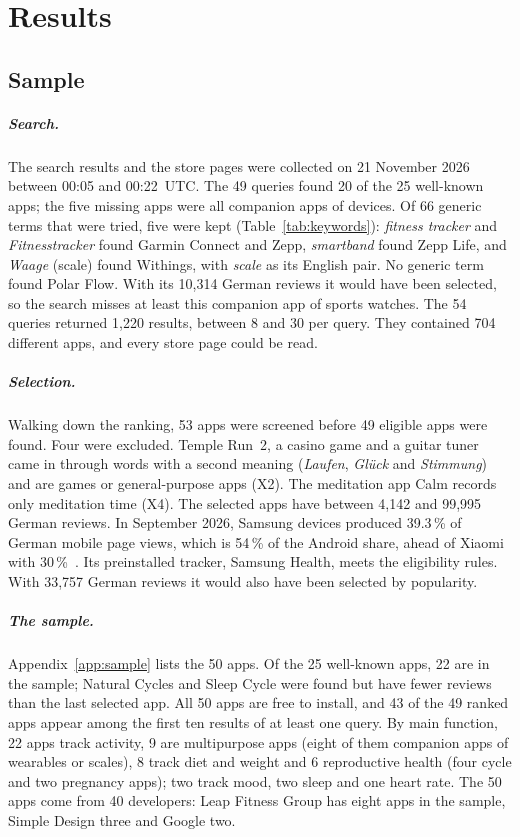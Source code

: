 \chapter{Results}
\label{ch:results}

\section{Sample}
\label{sec:results-sample}
\paragraph{Search.} The search results and the store pages were collected on
21 November 2026 between 00:05 and 00:22~UTC. The 49 queries found 20 of the
25 well-known apps; the five missing apps were all companion apps of devices.
Of 66 generic terms that were tried, five were kept
(Table~\ref{tab:keywords}): \emph{fitness tracker} and \emph{Fitnesstracker}
found Garmin Connect and Zepp, \emph{smartband} found Zepp Life, and
\emph{Waage} (scale) found Withings, with \emph{scale} as its English pair. No
generic term found Polar Flow. With its 10{,}314 German reviews it would have
been selected, so the search misses at least this companion app of sports
watches. The 54 queries returned 1{,}220 results, between 8 and 30 per query.
They contained 704 different apps, and every store page could be read.

\paragraph{Selection.} Walking down the ranking, 53 apps were screened before
49 eligible apps were found. Four were excluded. Temple Run~2, a casino game
and a guitar tuner came in through words with a second meaning
(\emph{Laufen}, \emph{Glück} and \emph{Stimmung}) and are games or
general-purpose apps (X2). The meditation app Calm records only meditation
time (X4). The selected apps have between 4{,}142 and 99{,}995 German reviews.
In September 2026, Samsung devices produced 39.3\,\% of German mobile page
views, which is 54\,\% of the Android share, ahead of Xiaomi with
30\,\%~\parencite{statcounter2026os,statcounter2026vendor}. Its preinstalled
tracker, Samsung Health, meets the eligibility rules. With 33{,}757 German
reviews it would also have been selected by popularity.

\paragraph{The sample.} Appendix~\ref{app:sample} lists the 50 apps. Of the
25 well-known apps, 22 are in the sample; Natural Cycles and Sleep Cycle were
found but have fewer reviews than the last selected app. All 50 apps are free
to install, and 43 of the 49 ranked apps appear among the first ten results of
at least one query. By main function, 22 apps track activity, 9 are
multipurpose apps (eight of them companion apps of wearables or scales), 8
track diet and weight and 6 reproductive health (four cycle and two pregnancy
apps); two track mood, two sleep and one heart rate. The 50 apps come from 40
developers: Leap Fitness Group has eight apps in the sample, Simple Design
three and Google two.
